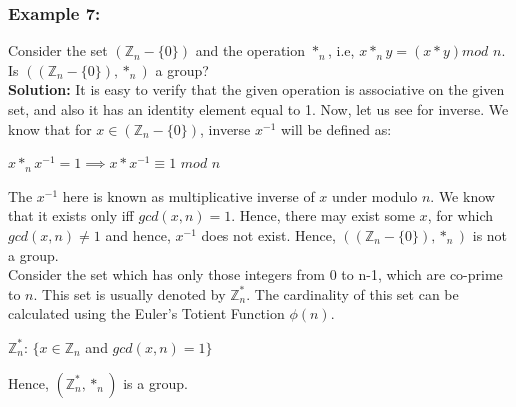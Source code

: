 \documentclass[11pt]{article}
\begin{document}
\subsubsection{Example 7:}
Consider the set $(\mathbb{Z}_n - \{0\})$ and the operation $*_n$, i.e, $x *_n y = (x * y) mod$ $n$. Is $((\mathbb{Z}_n - \{0\}), *_n)$ a group?\\
\textbf{Solution:} It is easy to verify that the given operation is associative on the given set, and also it has an identity element equal to 1. Now, let us see for inverse. We know that for $x \in (\mathbb{Z}_n - \{0\})$, inverse $x^{-1}$ will be defined as:
\begin{center}
    $x *_n x^{-1} = 1 \implies x * x^{-1} \equiv 1$ $mod$ $n$
\end{center}
The $x^{-1}$ here is known as multiplicative inverse of $x$ under modulo $n$. We know that it exists only iff $gcd(x, n) = 1$. Hence, there may exist some $x$, for which $gcd(x, n) \neq 1$ and hence, $x^{-1}$ does not exist. Hence, $((\mathbb{Z}_n - \{0\}), *_n)$ is not a group.\\
\vspace{3mm}
Consider the set which has only those integers from 0 to n-1, which are co-prime to $n$. This set is usually denoted by $\mathbb{Z}_n^*$. The cardinality of this set can be calculated using the Euler's Totient Function $\phi(n)$.
\begin{center}
    $\mathbb{Z}_n^*$: $\{x \in \mathbb{Z}_n$ and $gcd(x,n) = 1\}$
\end{center}
Hence, $(\mathbb{Z}_n^*, *_n)$ is a group.
\end{document}
